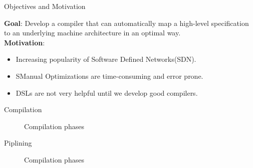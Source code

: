 \documentclass[final]{beamer}
\newlength{\onecolwid}
\begin{document}
\begin{frame}
\begin{columns}[t]
\begin{column}{\onecolwid}
\begin{exampleblock}{Objectives and Motivation}

\textbf{Goal}: Develop a compiler that can automatically map a high-level specification to an underlying machine architecture in an optimal way.\\
\textbf{Motivation}:
\begin{itemize}
\item Increasing popularity of Software Defined Networks(SDN).
\item SManual Optimizations are time-consuming and error prone.
\item DSLs are not very helpful until we develop good compilers.
\end{itemize}

\end{exampleblock}


\begin{exampleblock}{Compilation}


\begin{figure}
\caption{Compilation phases}
\end{figure}


\end{exampleblock}


\begin{exampleblock}{Piplining}


\begin{figure}
\caption{Compilation phases}
\end{figure}



\end{exampleblock}
\end{column}
\end{columns}
\end{frame}
\end{document}
